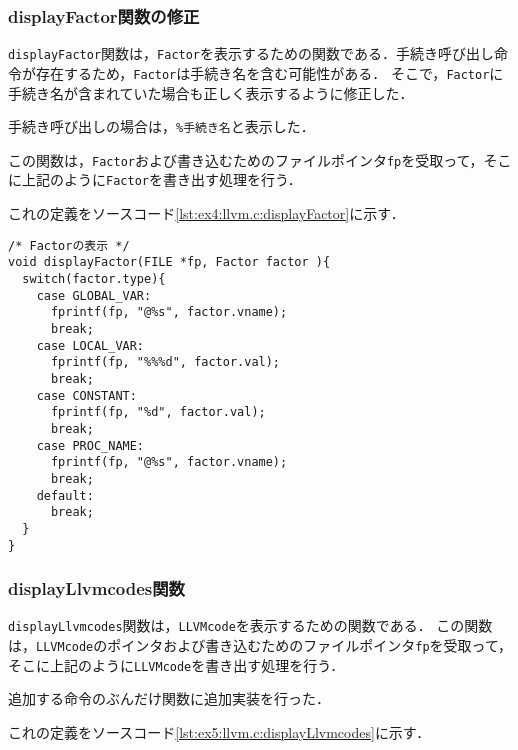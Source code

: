 \documentclass[uplatex]{jsarticle}
\begin{document}
\subsubsection{displayFactor関数の修正}
\verb#displayFactor#関数は，\verb#Factor#を表示するための関数である．手続き呼び出し命令が存在するため，\verb#Factor#は手続き名を含む可能性がある．
そこで，\verb#Factor#に手続き名が含まれていた場合も正しく表示するように修正した．

手続き呼び出しの場合は，\verb#%手続き名#と表示した．

この関数は，\verb#Factor#および書き込むためのファイルポインタ\verb#fp#を受取って，そこに上記のように\verb#Factor#を書き出す処理を行う．

これの定義をソースコード\ref{lst:ex4:llvm.c:displayFactor}に示す．
\begin{lstlisting}[caption=displayFactor関数の定義,label=lst:ex4:llvm.c:displayFactor]
/* Factorの表示 */
void displayFactor(FILE *fp, Factor factor ){
  switch(factor.type){
    case GLOBAL_VAR:
      fprintf(fp, "@%s", factor.vname);
      break;
    case LOCAL_VAR:
      fprintf(fp, "%%%d", factor.val);
      break;
    case CONSTANT:
      fprintf(fp, "%d", factor.val);
      break;
    case PROC_NAME:
      fprintf(fp, "@%s", factor.vname);
      break;
    default:
      break;
  }
}
\end{lstlisting}


\subsubsection{displayLlvmcodes関数}
\verb#displayLlvmcodes#関数は，\verb#LLVMcode#を表示するための関数である．
この関数は，\verb#LLVMcode#のポインタおよび書き込むためのファイルポインタ\verb#fp#を受取って，そこに上記のように\verb#LLVMcode#を書き出す処理を行う．

追加する命令のぶんだけ関数に追加実装を行った．

これの定義をソースコード\ref{lst:ex5:llvm.c:displayLlvmcodes}に示す．
\end{document}
